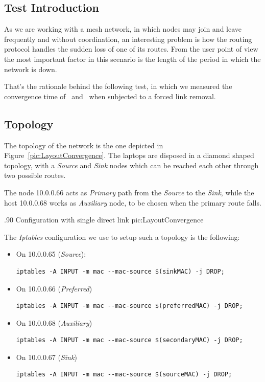 \subsection{Test Introduction}

    As we are working with a mesh network, in which nodes may join
    and leave frequently and without coordination, an interesting problem
    is how the routing protocol handles the sudden loss of one of its
    routes. From the user point of view the most important factor in this
    scenario is the length of the period in which the network is down.

    That's the rationale behind the following test, in which we measured
    the convergence time of \batman\ and \olsr\ when subjected to a forced
    link removal.

\subsection{Topology}

    The topology of the network is the one depicted in
    Figure~\ref{pic:LayoutConvergence}. The laptops are disposed in a
    diamond shaped topology, with a \emph{Source} and \emph{Sink} nodes
    which can be reached each other through two possible routes.

    The node 10.0.0.66 acts as \emph{Primary} path from the \emph{Source}
    to the \emph{Sink}, while the host 10.0.0.68 works as \emph{Auxiliary}
    node, to be chosen when the primary route falls.

            {.90\columnwidth}
            {Configuration with single direct link}
            {pic:LayoutConvergence}

    \noindent The \emph{Iptables} configuration we use to setup such a topology is
    the following:

    \begin{itemize}
    \item On 10.0.0.65 (\emph{Source}):

\begin{verbatim}
iptables -A INPUT -m mac --mac-source $(sinkMAC) -j DROP;
\end{verbatim}

    \item On 10.0.0.66 (\emph{Preferred})
\begin{verbatim}
iptables -A INPUT -m mac --mac-source $(preferredMAC) -j DROP;
\end{verbatim}

    \item On 10.0.0.68 (\emph{Auxiliary})
\begin{verbatim}
iptables -A INPUT -m mac --mac-source $(secondaryMAC) -j DROP;
\end{verbatim}

    \item On 10.0.0.67 (\emph{Sink})
\begin{verbatim}
iptables -A INPUT -m mac --mac-source $(sourceMAC) -j DROP;
\end{verbatim}
\end{itemize}

